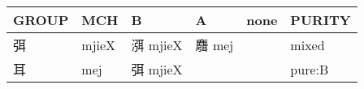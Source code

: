 \documentclass[14pt,a4paper]{scrartcl}
\begin{document}
\begin{longtable}[c]{@{}llllll@{}}
\toprule
\begin{minipage}[b]{0.14\columnwidth}\raggedright\strut
GROUP
\strut\end{minipage} &
\begin{minipage}[b]{0.14\columnwidth}\raggedright\strut
MCH
\strut\end{minipage} &
\begin{minipage}[b]{0.14\columnwidth}\raggedright\strut
B
\strut\end{minipage} &
\begin{minipage}[b]{0.14\columnwidth}\raggedright\strut
A
\strut\end{minipage} &
\begin{minipage}[b]{0.14\columnwidth}\raggedright\strut
none
\strut\end{minipage} &
\begin{minipage}[b]{0.14\columnwidth}\raggedright\strut
PURITY
\strut\end{minipage}\tabularnewline
\midrule
\endhead
\begin{minipage}[t]{0.14\columnwidth}\raggedright\strut
弭
\strut\end{minipage} &
\begin{minipage}[t]{0.14\columnwidth}\raggedright\strut
mjieX
\strut\end{minipage} &
\begin{minipage}[t]{0.14\columnwidth}\raggedright\strut
渳 mjieX
\strut\end{minipage} &
\begin{minipage}[t]{0.14\columnwidth}\raggedright\strut
麛 mej
\strut\end{minipage} &
\begin{minipage}[t]{0.14\columnwidth}\raggedright\strut
\strut\end{minipage} &
\begin{minipage}[t]{0.14\columnwidth}\raggedright\strut
mixed
\strut\end{minipage}\tabularnewline
\begin{minipage}[t]{0.14\columnwidth}\raggedright\strut
耳
\strut\end{minipage} &
\begin{minipage}[t]{0.14\columnwidth}\raggedright\strut
mej
\strut\end{minipage} &
\begin{minipage}[t]{0.14\columnwidth}\raggedright\strut
弭 mjieX
\strut\end{minipage} &
\begin{minipage}[t]{0.14\columnwidth}\raggedright\strut
\strut\end{minipage} &
\begin{minipage}[t]{0.14\columnwidth}\raggedright\strut
\strut\end{minipage} &
\begin{minipage}[t]{0.14\columnwidth}\raggedright\strut
pure:B
\strut\end{minipage}\tabularnewline
\bottomrule
\end{longtable}
\end{document}
